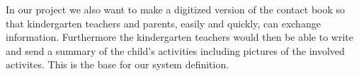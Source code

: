 In our project we also want to make a digitized version of the contact book so that kindergarten teachers and parents, easily and quickly, can exchange information. Furthermore the kindergarten teachers would then be able to write and send a summary of the child's activities including pictures of the involved activites. This is the base for our system definition.    